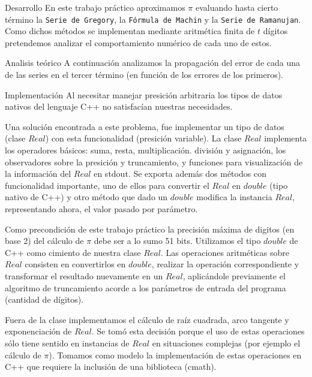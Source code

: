 \begin{section}{Desarrollo}
	En este trabajo práctico aproximamos $\pi$ evaluando hasta cierto término la \texttt{Serie de Gregory}, la \texttt{Fórmula de Machin} y la \texttt{Serie de Ramanujan}.
	Como dichos métodos se implementan mediante aritmética finita de $t$ dígitos pretendemos analizar el comportamiento numérico de cada uno de estos.
	 
	\begin{subsection}{Analisis teórico}
		A continuación analizamos la propagación del error de cada una de las series en el tercer término (en función de los errores de los primeros).\\
			
		
		\newpage
		
		\newpage
		
		
	\end{subsection}
	\begin{subsection}{Implementación}
		Al necesitar manejar presición arbitraria los tipos de datos nativos del lenguaje C++ no satisfacían nuestras necesidades.
		
		Una solución encontrada a este problema, fue implementar un tipo de datos (clase $Real$) con esta funcionalidad (presición variable). La clase $Real$ implementa los operadores básicos: suma, resta, multiplicación. división y asignación, los observadores sobre la presición y truncamiento, y funciones para visualización de la información del $Real$ en stdout. Se exporta además dos métodos con funcionalidad importante, uno de ellos para convertir el $Real$ en $double$ (tipo nativo de C++) y otro método que dado un $double$ modifica la instancia $Real$, representando ahora, el valor pasado por parámetro.
		
		Como precondición de este trabajo práctico la precisión máxima de digitos (en base 2) del cálculo de $\pi$ debe ser a lo sumo 51 bits.
		Utilizamos el tipo $double$ de C++ como cimiento de nuestra clase $Real$. Las operaciones aritméticas sobre $Real$ consisten en convertirlos en $double$, realizar la operación correspondiente y transformar el resultado nuevamente en un $Real$, aplicándole previamente el algoritmo de truncamiento
		acorde a los parámetros de entrada del programa (cantidad de dígitos).
		
		Fuera de la clase implementamos el cálculo de raíz cuadrada, arco tangente y exponenciación de $Real$. Se tomó esta decisión porque el uso de estas operaciones sólo tiene sentido en instancias de $Real$ en situaciones complejas (por ejemplo el cálculo de $\pi$). Tomamos como modelo la implementación de estas operaciones en C++ que requiere la inclusión de una biblioteca (cmath).
		

\end{subsection}
\end{section}
